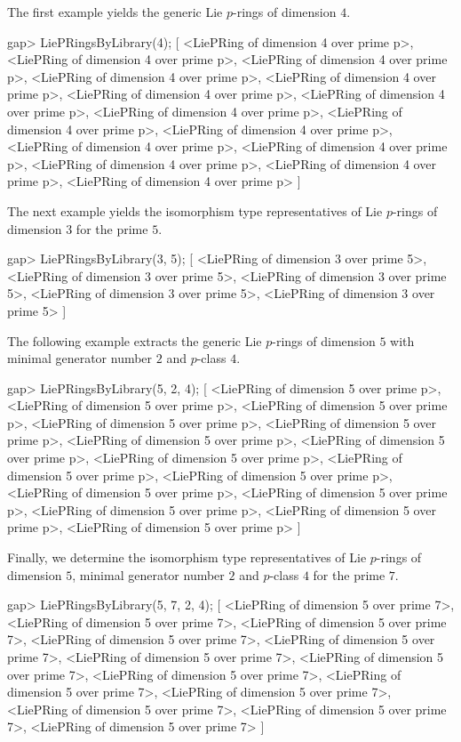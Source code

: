 The first example yields the generic Lie $p$-rings of dimension $4$.

\beginexample
gap> LiePRingsByLibrary(4);
[ <LiePRing of dimension 4 over prime p>, 
  <LiePRing of dimension 4 over prime p>, 
  <LiePRing of dimension 4 over prime p>, 
  <LiePRing of dimension 4 over prime p>, 
  <LiePRing of dimension 4 over prime p>, 
  <LiePRing of dimension 4 over prime p>, 
  <LiePRing of dimension 4 over prime p>, 
  <LiePRing of dimension 4 over prime p>,
  <LiePRing of dimension 4 over prime p>, 
  <LiePRing of dimension 4 over prime p>, 
  <LiePRing of dimension 4 over prime p>, 
  <LiePRing of dimension 4 over prime p>, 
  <LiePRing of dimension 4 over prime p>, 
  <LiePRing of dimension 4 over prime p>, 
  <LiePRing of dimension 4 over prime p> ]
\endexample

The next example yields the isomorphism type representatives of Lie 
$p$-rings of dimension $3$ for the prime $5$.

\beginexample
gap> LiePRingsByLibrary(3, 5);
[ <LiePRing of dimension 3 over prime 5>, 
  <LiePRing of dimension 3 over prime 5>, 
  <LiePRing of dimension 3 over prime 5>, 
  <LiePRing of dimension 3 over prime 5>, 
  <LiePRing of dimension 3 over prime 5> ]
\endexample

The following example extracts the generic Lie $p$-rings of dimension
$5$ with minimal generator number $2$ and $p$-class $4$.

\beginexample
gap> LiePRingsByLibrary(5, 2, 4);
[ <LiePRing of dimension 5 over prime p>, 
  <LiePRing of dimension 5 over prime p>, 
  <LiePRing of dimension 5 over prime p>, 
  <LiePRing of dimension 5 over prime p>, 
  <LiePRing of dimension 5 over prime p>, 
  <LiePRing of dimension 5 over prime p>, 
  <LiePRing of dimension 5 over prime p>, 
  <LiePRing of dimension 5 over prime p>, 
  <LiePRing of dimension 5 over prime p>, 
  <LiePRing of dimension 5 over prime p>, 
  <LiePRing of dimension 5 over prime p>, 
  <LiePRing of dimension 5 over prime p>, 
  <LiePRing of dimension 5 over prime p>, 
  <LiePRing of dimension 5 over prime p>, 
  <LiePRing of dimension 5 over prime p> ]
\endexample

Finally, we determine the isomorphism type representatives of Lie
$p$-rings of dimension $5$, minimal generator number $2$ and $p$-class
$4$ for the prime $7$.

\beginexample
gap> LiePRingsByLibrary(5, 7, 2, 4);
[ <LiePRing of dimension 5 over prime 7>, 
  <LiePRing of dimension 5 over prime 7>, 
  <LiePRing of dimension 5 over prime 7>, 
  <LiePRing of dimension 5 over prime 7>, 
  <LiePRing of dimension 5 over prime 7>, 
  <LiePRing of dimension 5 over prime 7>, 
  <LiePRing of dimension 5 over prime 7>, 
  <LiePRing of dimension 5 over prime 7>, 
  <LiePRing of dimension 5 over prime 7>, 
  <LiePRing of dimension 5 over prime 7>, 
  <LiePRing of dimension 5 over prime 7>, 
  <LiePRing of dimension 5 over prime 7>, 
  <LiePRing of dimension 5 over prime 7> ]
\endexample

